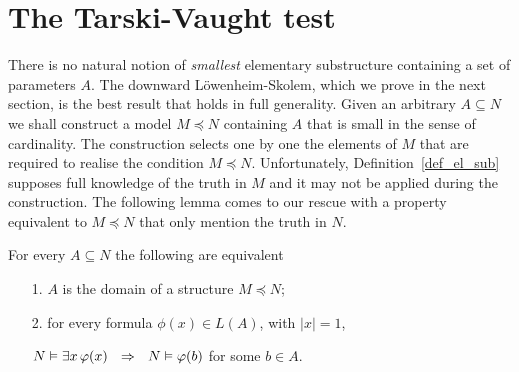 \documentclass[creche.tex]{subfiles}
\begin{document}
\begin{comment}
\begin{exercise}
Si dimostri che $\RR$ and $\0$ sono gli unici due sottoinsiemi $X\subseteq\RR$ such that:
\begin{itemize}
\item[]  $b\approx a\in\ns X \ \ \IMP\ \ b\in\ns X$ for every coppia di iperreali $a, b$.\QED
\end{itemize}
\end{exercise}

\begin{exercise}
Si dimostri che $|\RR|\;\le\;|\nsQ|$ ovvero che $\nsQ$ ha almeno la cardinalit\`a del continuo.
(Suggerimento: si definisca una funzione iniettiva $f:\RR\to\nsQ$ scegliendo nella monade di ogni reale standard un razionale nonstandard.)\QED
\end{exercise}
\end{comment}
\section{The Tarski-Vaught test}

There is no natural notion of \textit{smallest\/} elementary substructure containing a set of parameters $A$.
The downward L\"owenheim-Skolem, which we prove in the next section, is the best result that holds in full generality.
Given an arbitrary $A\subseteq N$ we shall construct a model $M\preceq N$ containing $A$ that is small in the sense of cardinality.
The construction selects one by one the elements of $M$ that are required to realise the condition $M\preceq N$.
Unfortunately, Definition~\ref{def_el_sub} supposes full knowledge of the truth in $M$ and it may not be applied during the construction.
The following lemma comes to our rescue with a property equivalent to $M\preceq N$ that only mention the truth in $N$.

\begin{lemma}\label{TarskiVaught}%
For every $A\subseteq N$ the following are equivalent
\begin{itemize}
\item[1.] $A$ is the domain of a structure $M\preceq N$;
\item[2.] for every formula $\phi(x)\in L(A)$, with $|x|=1$,\smallskip

$N\models\E x\,\phi(x)\ \ \IMP\ \ N\models\phi(b)$ for some $b\in A$.
\end{itemize}
\end{lemma}
\end{document}
